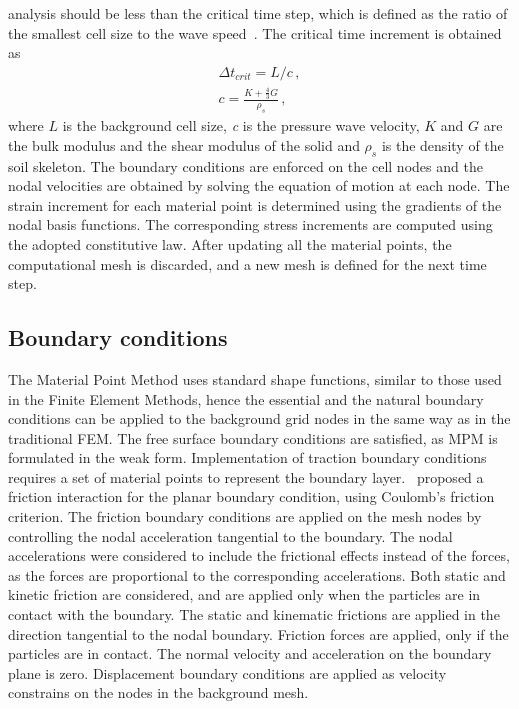 analysis should be less than the critical time step, which is defined as the 
ratio of the smallest cell size to the wave speed~\citep{Chen2002}. The 
critical time increment is obtained as
%
\begin{align}
\Delta t_{crit} = L / c \,, \\
c = \frac{K+\frac{4}{3}G}{\rho_s} \,,
\end{align}
where $L$ is the background cell size, \textit{c} is the pressure wave 
velocity, $K$ and $G$ are the bulk modulus and the shear modulus of the solid 
and $\rho_s$ is the density of the soil skeleton. The boundary conditions are 
enforced on the cell nodes and the nodal velocities are obtained by solving the 
equation of motion at each node. The strain increment for each material point 
is determined using the gradients of the nodal basis functions. The 
corresponding stress increments are computed using the adopted constitutive 
law. After updating all the material points, the computational mesh is 
discarded, and a new mesh is defined for the next time step. 

\subsection{Boundary conditions}
The Material Point Method uses standard shape functions, similar to those used 
in the Finite Element Methods, hence the essential and the natural boundary 
conditions can be applied to the background grid nodes in the same way as in 
the traditional FEM. The free surface boundary conditions are satisfied, as MPM 
is formulated in the weak form. Implementation of traction boundary conditions 
requires a set of material points to represent the boundary 
layer.~\citet{Bandara2013} proposed a friction interaction for the planar 
boundary condition, using Coulomb's friction criterion. The friction boundary 
conditions are applied on the mesh nodes by controlling the nodal acceleration 
tangential to the boundary. The nodal accelerations 
were considered to include the frictional effects instead of the forces, as the 
forces are proportional to the corresponding accelerations. Both static and 
kinetic friction are considered, and are applied only when the particles 
are in contact with the boundary. The static and kinematic frictions are 
applied in the direction tangential to the nodal boundary. Friction 
forces are applied, only if the particles are in contact. The normal velocity 
and acceleration on the boundary plane is zero. Displacement boundary 
conditions are applied as velocity constrains on the nodes in the background 
mesh.

